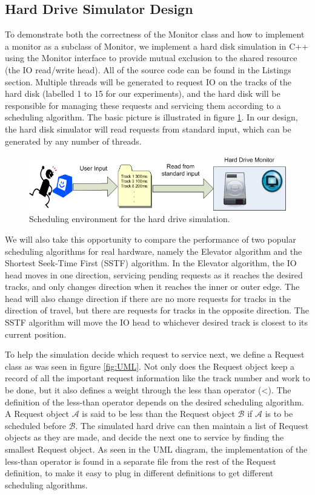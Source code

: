 \documentclass{report}
\begin{document}
\subsection{Hard Drive Simulator Design}
To demonstrate both the correctness of the Monitor class and how to implement a monitor as
a subclass of Monitor, we implement a hard disk simulation in C++ using the Monitor
interface to provide mutual exclusion to the shared resource (the IO read/write head).
All of the source code can be found in the Listings section.
Multiple threads will be generated to request IO on the tracks of the hard disk (labelled
1 to 15 for our experiments), and the hard disk will be responsible for managing these
requests and servicing them according to a scheduling algorithm. The basic picture is
illustrated in figure \ref{fig:sched}. In our design, the hard disk simulator will read
requests from standard input, which can be generated by any number of threads.
\begin{figure}[htb!]
    \centering
    \includegraphics[scale=0.6]{Scheduling_Env.png}
    \caption{Scheduling environment for the hard drive simulation.}
    \label{fig:sched}
\end{figure}

We will also take this opportunity to compare the performance of two popular scheduling
algorithms for real hardware, namely the Elevator algorithm and the Shortest Seek-Time
First (SSTF) algorithm. In the Elevator algorithm, the IO head moves in one direction,
servicing pending requests as it reaches the desired tracks, and only changes direction
when it reaches the inner or outer edge. The head will also change direction if there are 
no more requests for tracks in the direction of travel, but there are requests for tracks
in the opposite direction. The SSTF algorithm will move the IO head to whichever desired
track is closest to its current position.

To help the simulation decide which request to service next, we define a Request class as
was seen in figure \ref{fig:UML}. Not only does the Request object keep a record of all
the important request information like the track number and work to be done, but it also
defines a weight through the less than operator (<). The definition of the less-than
operator depends on the desired scheduling algorithm. A Request object $\mathcal{A}$ is said to be
less than the Request object $\mathcal{B}$ if $\mathcal{A}$ is to be scheduled before
$\mathcal{B}$. The simulated hard drive can then maintain a list of
Request objects as they are made, and decide the next one to service by finding the
smallest Request object. As seen in the UML diagram, the implementation of the less-than
operator is found in a separate file from the rest of the Request definition, to make it
easy to plug in different definitions to get different scheduling algorithms.
\end{document}
